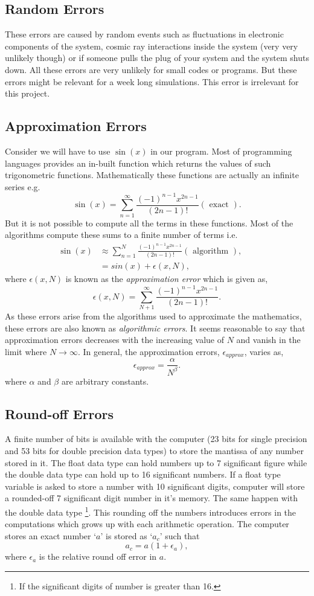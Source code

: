 \documentclass[a4,12pt]{article}
\numberwithin{equation}{subsection}
\begin{document}
\subsection{Random Errors}
These errors are caused by random events such as fluctuations in electronic components of the system, cosmic ray interactions inside the system (very very unlikely though) or if someone pulls the plug of your system and the system shuts down. All these errors are very unlikely for small codes or programs. But these errors might be relevant for a week long simulations. This error is irrelevant for this project.

\subsection{Approximation Errors}
Consider we will have to use $\sin(x)$ in our program. Most of programming languages provides an in-built function which returns the values of such trigonometric functions. Mathematically these functions are actually an infinite series e.g. 
$$\sin(x) = \sum^{\infty}_{n=1} \frac{(-1)^{n-1}x^{2n-1}}{(2n-1)!} (\text{ exact }).$$
But it is not possible to compute all the terms in these functions. Most of the algorithms compute these sums to a finite number of terms i.e.
\begin{align}
\sin(x) &\approx \sum^{N}_{n=1} \frac{(-1)^{n-1}x^{2n-1}}{(2n-1)!} (\text{ algorithm }), && \\
        &= sin(x)+\epsilon(x,N), && 
 \end{align}  
 where $\epsilon(x,N)$ is known as the \textit{approximation error} which is given as,
$$\epsilon(x,N) = \sum^{\infty}_{N+1} \frac{(-1)^{n-1}x^{2n-1}}{(2n-1)!} .$$
As these errors arise from the algorithms used to approximate the mathematics, these errors are also known as \textit{algorithmic errors}. It seems reasonable to say that approximation errors decreases with the increasing value of $N$ and vanish in the limit where $N \to \infty$. In general, the approximation errors, $\epsilon_{approx}$, varies as, 
$$\epsilon_{approx} = \frac{\alpha}{N^{\beta}}.$$
where $\alpha$ and $\beta$ are arbitrary constants.

\subsection{Round-off Errors}
A finite number of bits is available with the computer (23 bits for single precision and 53 bits for double precision data types) to store the mantissa of any number stored in it. The float data type can hold numbers up to 7 significant figure while the double data type can hold up to 16 significant numbers. If a float type variable is asked to store a number with 10 significant digits, computer will store a rounded-off 7 significant digit number in it's memory. The same happen with the double data type \footnote[1]{If the significant digits of number is greater than 16.}. This rounding off the numbers introduces errors in the computations which grows up with each arithmetic operation. The computer stores an exact number `$a$' is stored as `$a_c$' such that 
$$a_c = a(1+\epsilon_a),$$
where $\epsilon_a$ is the relative round off error in $a$. 
\end{document}
